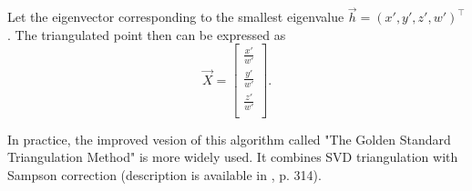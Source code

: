 Let the eigenvector corresponding to the smallest eigenvalue $\vec{h} = (x', y', z', w')^\top$.
The triangulated point then can be expressed as
\begin{equation}
    \vec{X} = \begin{bmatrix}
        \frac{x'}{w'} \\
        \frac{y'}{w'} \\
        \frac{z'}{w'} \\
    \end{bmatrix}.
\end{equation}

In practice, the improved vesion of this algorithm called "The Golden Standard Triangulation Method" is more widely used.
It combines SVD triangulation with Sampson correction (description is available in \cite{hartley_zisserman_2004}, p. 314). 
